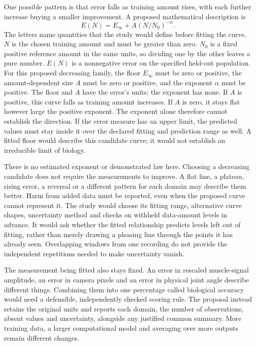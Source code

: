 One possible pattern is that error falls as training amount rises, with each further increase buying a smaller improvement. A proposed mathematical description is
\[
E(N)=E_{\infty}+A\left(N/N_0\right)^{-\alpha}.
\]
The letters name quantities that the study would define before fitting the curve. $N$ is the chosen training amount and must be greater than zero. $N_0$ is a fixed positive reference amount in the same units, so dividing one by the other leaves a pure number. $E(N)$ is a nonnegative error on the specified held-out population. For this proposed decreasing family, the floor $E_{\infty}$ must be zero or positive, the amount-dependent size $A$ must be zero or positive, and the exponent $\alpha$ must be positive. The floor and $A$ have the error's units; the exponent has none. If $A$ is positive, this curve falls as training amount increases. If $A$ is zero, it stays flat however large the positive exponent. The exponent alone therefore cannot establish the direction. If the error measure has an upper limit, the predicted values must stay inside it over the declared fitting and prediction range as well. A fitted floor would describe this candidate curve; it would not establish an irreducible limit of biology.

There is no estimated exponent or demonstrated law here. Choosing a decreasing candidate does not require the measurements to improve. A flat line, a plateau, rising error, a reversal or a different pattern for each domain may describe them better. Harm from added data must be reported, even when the proposed curve cannot represent it. The study would choose its fitting range, alternative curve shapes, uncertainty method and checks on withheld data-amount levels in advance. It would ask whether the fitted relationship predicts levels left out of fitting, rather than merely drawing a pleasing line through the points it has already seen. Overlapping windows from one recording do not provide the independent repetitions needed to make uncertainty vanish.

The measurement being fitted also stays fixed. An error in rescaled muscle-signal amplitude, an error in camera pixels and an error in physical joint angle describe different things. Combining them into one percentage called biological accuracy would need a defensible, independently checked scoring rule. The proposal instead retains the original units and reports each domain, the number of observations, absent values and uncertainty, alongside any justified common summary. More training data, a larger computational model and averaging over more outputs remain different changes.

